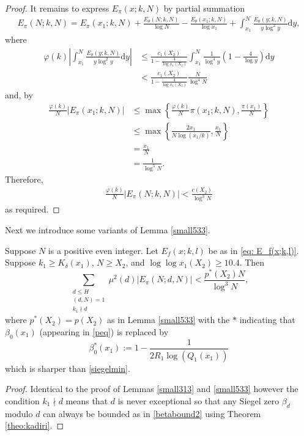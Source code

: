 \documentclass[12pt]{amsart}
\begin{document}
\begin{proof}
It remains to express $E_{\pi}(x; k,N)$ by partial summation
\begin{align*}
    E_{\pi}(N; k, N) = E_{\pi}(x_1; k, N) + \frac{E_{\theta}(N; k, N)}{\log N} - \frac{E_{\theta}(x_1; k, N)}{\log x_1} + \int_{x_1}^{N} \frac{E_{\theta}(y; k, N)}{y \log^2 y} \mathrm{d}y,
\end{align*}
where
\begin{align*}
    \varphi(k)\left|\int_{x_1}^{N} \frac{E_{\theta}(y; k, N)}{y \log^2 y} \mathrm{d}y\right|&\le\frac{c_1(X_2)}{1-\frac{4}{\log x_1(X_2)}}\int_{x_1}^N\frac{1}{\log^4y}\left(1-\frac{4}{\log y}\right)\mathrm{d}y\\
    &<\frac{c_1(X_2)}{1-\frac{4}{\log x_1(X_2)}}\frac{N}{\log^4 N}
\end{align*}
and, by \cite[Theorem 2]{M-V}
\begin{align*}
    \frac{\varphi(k)}{N}|E_{\pi}(x_1; k,N)| &\le\max\left\{\frac{\varphi(k)}{N}\pi(x_1;k,N),\frac{\pi(x_1)}{N}\right\}\\
    &\le\max\left\{\frac{2x_1}{N\log(x_1/k)},\frac{x_1}{N}\right\}\\
    &=\frac{x_1}{N}\\
    &=\frac{1}{\log^5 N}.
\end{align*}
Therefore,
\begin{align*}
    \frac{\varphi(k)}{N}|E_{\pi}(N; k, N)| < \frac{c(X_2)}{\log^3 N}
\end{align*}
as required.
\end{proof}

Next we introduce some variants of Lemma \ref{small533}.

\begin{lemma}\label{large533}
Suppose $N$ is a positive even integer.
Let $E_f(x;k,l)$ be as in \eqref{eq: E_f(x;k,l)}. Suppose $k_1\ge K_{\delta}(x_1)$, $N \ge X_2$, and $\log\log x_1(X_2)\ge 10.4$. Then
    \begin{equation*}
        \sum_{\substack{d\le H\\(d,N)=1\\ k_1\nmid d}}\mu^2(d)|E_{\pi}(N;d,N)|<\frac{p^*(X_2)N}{\log^3 N},
    \end{equation*}
    where $p^*(X_2)=p(X_2)$ as in Lemma \ref{small533} with the $*$ indicating that $\beta_0(x_1)$ (appearing in \eqref{peq}) is replaced by
    \begin{equation}\label{betabound2}
        \beta_0^*(x_1):= 1-\frac{1}{2R_1\log (Q_1(x_1))}
    \end{equation}
    which is sharper than \eqref{siegelmin}.
\end{lemma}
\begin{proof}
    Identical to the proof of Lemmas \ref{small313} and \ref{small533} however the condition $k_1\nmid d$ means that $d$ is never exceptional so that any Siegel zero $\beta_d$ modulo $d$ can always be bounded as in \eqref{betabound2} using Theorem \ref{theo:kadiri}.
\end{proof}
\end{document}
